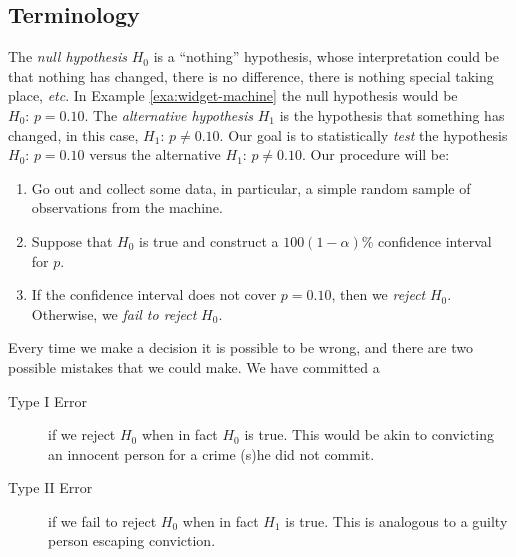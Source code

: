 \documentclass[captions=tableheading]{scrbook}
\begin{document}
\subsection{Terminology}
\label{sec-10-1-1}


The \emph{null hypothesis} \(H_{0}\) is a ``nothing'' hypothesis, whose interpretation could be that nothing has changed, there is no difference, there is nothing special taking place, \emph{etc}. In Example \ref{exa:widget-machine} the null hypothesis would be \(H_{0}:\, p=0.10.\) The \emph{alternative hypothesis} \(H_{1}\) is the hypothesis that something has changed, in this case, \(H_{1}:\, p\neq0.10\). Our goal is to statistically \emph{test} the hypothesis \(H_{0}:\, p=0.10\) versus the alternative \(H_{1}:\, p\neq0.10\). Our procedure will be:
\begin{enumerate}
\item Go out and collect some data, in particular, a simple random sample of observations from the machine.
\item Suppose that \(H_{0}\) is true and construct a \(100(1-\alpha)\%\) confidence interval for \(p\).
\item If the confidence interval does not cover \(p=0.10\), then we \emph{reject} \(H_{0}\). Otherwise, we \emph{fail to reject} \(H_{0}\).
\end{enumerate}

\begin{rem}
Every time we make a decision it is possible to be wrong, and there are two possible mistakes that we could make. We have committed a 
\begin{description}
\item[Type I Error] if we reject \(H_{0}\) when in fact \(H_{0}\) is true. This would be akin to convicting an innocent person for a crime (s)he did not commit.
\item[Type II Error] if we fail to reject \(H_{0}\) when in fact \(H_{1}\) is true. This is analogous to a guilty person escaping conviction.
\end{description}
\end{rem}
\end{document}
